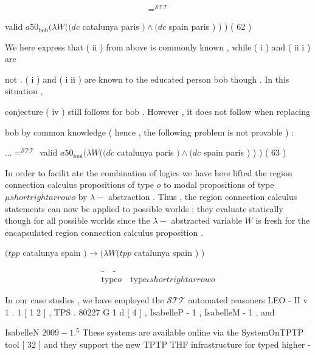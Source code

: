 \documentclass[10pt]{article}
\begin{document}
\[ = ^{ \mathcal{STT} }\]


\hspace*{\fill}valid  $ a50 _{ \mathrm{bob} }  (  \lambda  W   (  (  dc $  catalunya paris  $ )   \wedge   (  dc $  spain paris ) ) ) \quad ( 62 ) 

\noindent We here express that ( ii ) from above is commonly known , while ( i ) and ( ii i ) are 

\noindent not . ( i ) and ( i ii ) are known to the educated person bob though . In this situation , 

\noindent conjecture ( iv ) still follows for bob . However , it does not follow when replacing 

\noindent bob by common knowledge ( hence , the following problem is not provable ) : 

\hspace*{\fill} $ .   .   .   = ^{ \mathcal{STT} }$  valid  $ a50 _{ \mathrm{fool} }  (  \lambda  W   (  (  dc $  catalunya paris  $ )   \wedge   (  dc $  spain paris ) ) ) \quad ( 63 ) 

In order to facilit ate the combination of logics we have here lifted the region 
 connection calculus propositions of type  $ o $  to modal propositions of type  $ \mu   shortrightarrow   o $  
 by  $ \lambda  - $  abstraction . Thus , the region connection calculus statements can now be 
 applied to possible worlds ; they evaluate statically though for all possible worlds 
 since the  $ \lambda  - $  abstracted variable  $ W $  is fresh for the encapsulated region connection 
 calculus proposition . 

\centerline{ $ (  tpp $  catalunya spain  $ )   \rightarrow   (  \lambda  W   (  tpp $  catalunya spain ) ) }

\[\begin{aligned} \underbrace{\ }  \quad  \underbrace{\ } \\
  \mathrm{type}  o  \quad  \mathrm{type}  \iota  shortrightarrow  o \end{aligned}\]



\newpage
{}  

\noindent In our case studies , we have employed the  $ \mathcal{STT} $  automated reasoners LEO - 
 II \quad v 1 . 1 [ 1 2 ] , TPS  . 80227 G 1 d [ 4 ] , IsabelleP  - 1 , IsabelleM  - 1 , and 

\noindent IsabelleN \quad  $ 2009  -  1  . ^{ 5 }$  These systems are available online via the SystemOnTPTP 
 tool [ 32 ] and they support the new TPTP THF infrastructure for typed higher - 
\end{document}

